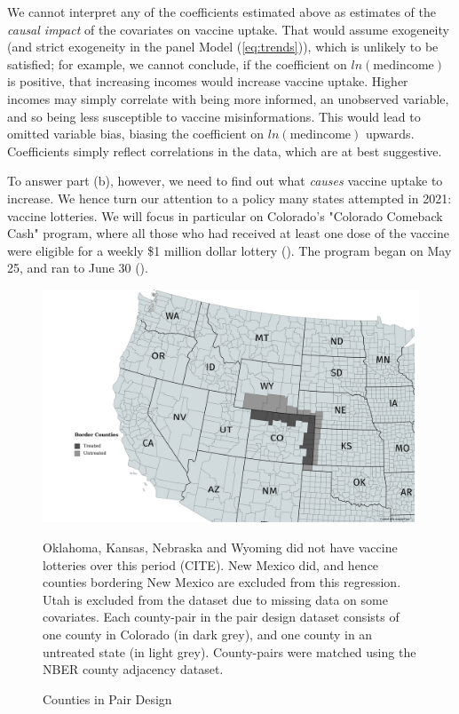 \documentclass[12pt]{article}
\begin{document}
\begin{spacing}{1.5}
		
		We cannot interpret any of the coefficients estimated above as estimates of the \textit{causal impact} of the covariates on vaccine uptake. That would assume exogeneity (and strict exogeneity in the panel Model (\ref{eq:trends})), which is unlikely to be satisfied; for example, we cannot conclude, if the coefficient on $ln(\textrm{medincome})$ is positive, that increasing incomes would increase vaccine uptake. Higher incomes may simply correlate with being more informed, an unobserved variable, and so being less susceptible to vaccine misinformations. This would lead to omitted variable bias, biasing the coefficient on $ln(\textrm{medincome})$ upwards. Coefficients simply reflect correlations in the data, which are at best suggestive.
		
		To answer part (b), however, we need to find out what \textit{causes} vaccine uptake to increase. We hence turn our attention to a policy many states attempted in 2021: vaccine lotteries. We will focus in particular on Colorado's "Colorado Comeback Cash" program, where all those who had received at least one dose of the vaccine were eligible for a weekly \$1 million dollar lottery (\cite{murphy_colorado_2021}). The program began on May 25, and ran to June 30 (\cite{thirumurthy_association_2022}).
		
		\begin{figure}
			\centering
			\includegraphics[width=6in]{../graphs/Border_Counties.png}
			\caption*{\footnotesize{Oklahoma, Kansas, Nebraska and Wyoming did not have vaccine lotteries over this period (CITE). New Mexico did, and hence counties bordering New Mexico are excluded from this regression. Utah is excluded from the dataset due to missing data on some covariates. Each county-pair in the pair design dataset consists of one county in Colorado (in dark grey), and one county in an untreated state (in light grey). County-pairs were matched using the NBER county adjacency dataset.}}
			\caption{Counties in Pair Design}
			\label{fig:bordercounties}
		\end{figure}
		

\end{spacing}
\end{document}
